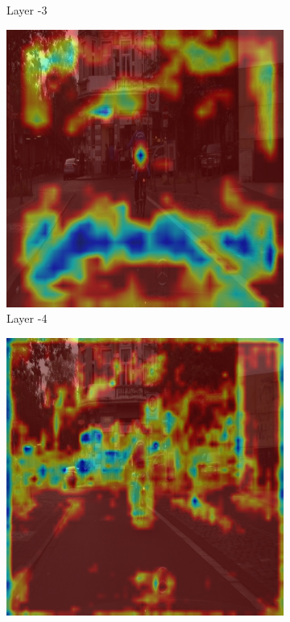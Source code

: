 \begin{figure}[h!]
\begin{subfigure}[b]{0.49\textwidth}
        \caption{Layer -3}
        \label{fig:b-3}
    \end{subfigure}
    \hfill
    \begin{subfigure}[b]{0.49\textwidth}
        \centering
        \includegraphics[width=\textwidth]{figures/bonn_000036_000019_leftImg8bit.pnglayer-4/bonn_000036_000019_leftImg8bit.png_object(0)_heatmap}
        \caption{Layer -4}
        \label{fig:b-4}
    \end{subfigure}
    \hfill
    \begin{subfigure}[b]{0.49\textwidth}
        \centering
        \includegraphics[width=\textwidth]{figures/bonn_000036_000019_leftImg8bit.pnglayer-5/bonn_000036_000019_leftImg8bit.png_object(0)_heatmap}

\end{subfigure}
\end{figure}
